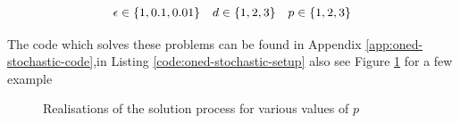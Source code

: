 \begin{equation*}
  \begin{array}{c c c}
    \epsilon \in \{1, 0.1, 0.01\} &
    d \in \{1, 2, 3\} &
    p \in \{1, 2, 3\}
  \end{array}
\end{equation*}

The code which solves these problems can be found in Appendix
\ref{app:oned-stochastic-code},in Listing \ref{code:oned-stochastic-setup} also
see Figure \ref{fig:oned-stochastic-realisations} for a few example

\begin{figure}
    \centering
    \begin{subfigure}[b]{0.55\textwidth}
        \centering
    \end{subfigure}
    \begin{subfigure}[b]{0.55\textwidth}
        \centering
    \end{subfigure}
    \caption{Realisations of the solution process for various values of $p$}
    \label{fig:oned-stochastic-realisations}
\end{figure}

